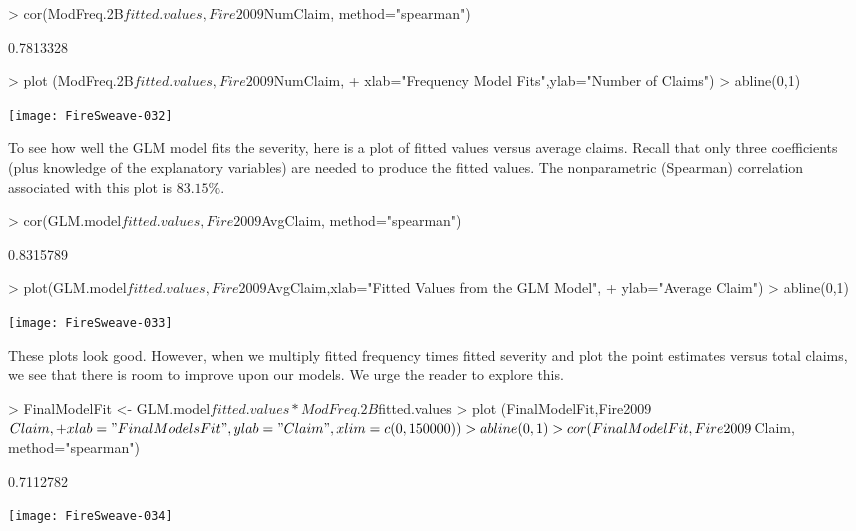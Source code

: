 \documentclass[12pt,letterpaper]{article}
\begin{document}
\begin{center}
\begin{Schunk}
\begin{Sinput}
> cor(ModFreq.2B$fitted.values,Fire2009$NumClaim, method="spearman")      
\end{Sinput}
\begin{Soutput}
[1] 0.7813328
\end{Soutput}
\begin{Sinput}
> plot (ModFreq.2B$fitted.values,Fire2009$NumClaim,
+       xlab="Frequency Model Fits",ylab="Number of Claims")
> abline(0,1)
\end{Sinput}
\end{Schunk}
\texttt{[image: FireSweave-032]}
\end{center}


To see how well the GLM model fits the severity, here is a plot of fitted values versus average claims.
Recall that only three coefficients (plus knowledge of the explanatory variables) are needed
to produce the fitted values. The nonparametric (Spearman) correlation associated with
this plot is $83.15\%$.

\begin{center}
\begin{Schunk}
\begin{Sinput}
> cor(GLM.model$fitted.values,Fire2009$AvgClaim, method="spearman")      
\end{Sinput}
\begin{Soutput}
[1] 0.8315789
\end{Soutput}
\begin{Sinput}
> plot(GLM.model$fitted.values,Fire2009$AvgClaim,xlab="Fitted Values from the GLM Model",
+                                                ylab="Average Claim")
> abline(0,1)
\end{Sinput}
\end{Schunk}
\texttt{[image: FireSweave-033]}
\end{center}

These plots look good. However, when we multiply fitted frequency times fitted severity
and plot the point estimates versus total claims, we see that there is room to improve
upon our models. We urge the reader to explore this.

\begin{center}
\begin{Schunk}
\begin{Sinput}
> FinalModelFit <- GLM.model$fitted.values*ModFreq.2B$fitted.values
> plot (FinalModelFit,Fire2009$Claim,
+      xlab="Final Models Fit",ylab="Claim",xlim=c(0,150000))
> abline(0,1)
> cor(FinalModelFit,Fire2009$Claim, method="spearman")
\end{Sinput}
\begin{Soutput}
[1] 0.7112782
\end{Soutput}
\end{Schunk}
\texttt{[image: FireSweave-034]}
\end{center}
\end{document}
